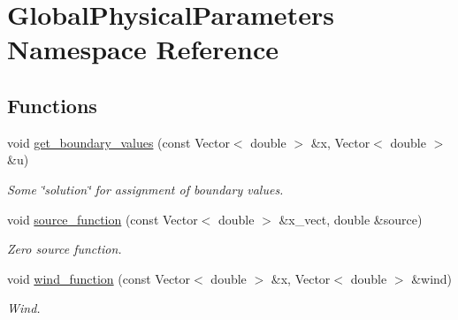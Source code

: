 \hypertarget{namespaceGlobalPhysicalParameters}{}\section{Global\+Physical\+Parameters Namespace Reference}
\label{namespaceGlobalPhysicalParameters}
\subsection*{Functions}
\begin{DoxyCompactItemize}
\item 
void \hyperlink{namespaceGlobalPhysicalParameters_a6e1db5726436a705e9d400fedf914cef}{get\+\_\+boundary\+\_\+values} (const Vector$<$ double $>$ \&x, Vector$<$ double $>$ \&u)
\begin{DoxyCompactList}\small\item\em Some \char`\"{}solution\char`\"{} for assignment of boundary values. \end{DoxyCompactList}\item 
void \hyperlink{namespaceGlobalPhysicalParameters_aa84986d4d50cb043cc8fced56feab45f}{source\+\_\+function} (const Vector$<$ double $>$ \&x\+\_\+vect, double \&source)
\begin{DoxyCompactList}\small\item\em Zero source function. \end{DoxyCompactList}\item 
void \hyperlink{namespaceGlobalPhysicalParameters_a3a17e62bc0096244627f5f1a7f53c859}{wind\+\_\+function} (const Vector$<$ double $>$ \&x, Vector$<$ double $>$ \&wind)
\begin{DoxyCompactList}\small\item\em Wind. \end{DoxyCompactList}\end{DoxyCompactItemize}
